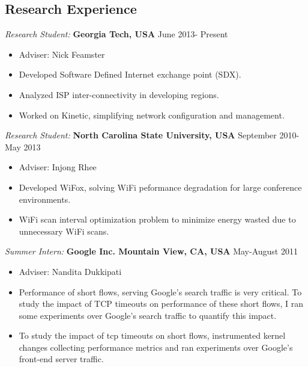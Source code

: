 \documentclass[11pt]{res}
\begin{document}
\begin{resume}
\section{{Research Experience}}

{\sl Research Student: } \textbf{Georgia Tech, USA} \hfill June 2013- Present
\begin{itemize} \itemsep -2pt %
\item Adviser: Nick Feamster
\item Developed Software Defined Internet exchange point (SDX). 
\item Analyzed ISP inter-connectivity in developing regions.
\item Worked on Kinetic, simplifying network configuration and management. 

\end{itemize}
{\sl Research Student: } \textbf{North Carolina State University, USA} \hfill September 2010-May 2013
\begin{itemize} \itemsep -2pt %
\item Adviser: Injong Rhee
\item Developed WiFox, solving WiFi peformance degradation for large conference environments.
\item WiFi scan interval optimization problem to minimize energy wasted due to unnecessary WiFi scans.
\end{itemize}



{\sl Summer Intern: } \textbf{Google Inc. Mountain View, CA, USA} \hfill May-August 2011 
\begin{itemize} \itemsep -2pt %
\item Adviser: Nandita Dukkipati
\item Performance of short flows, serving Google's search traffic is very critical. 
To study the impact of TCP timeouts on performance of these short flows, I ran some experiments over 
Google's search traffic to quantify this impact. 
\item To study the impact of tcp timeouts on short flows, instrumented kernel changes collecting performance metrics and ran 
experiments over Google's front-end server traffic. 
\end{itemize}



\end{resume}
\end{document}
